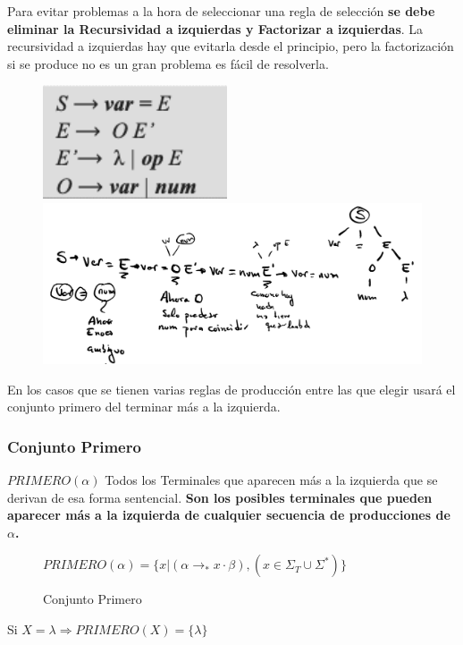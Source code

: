 \documentclass[12pt, twoside, openright]{report} %
\begin{document}
Para evitar problemas a la hora de seleccionar una regla de selección
\textbf{se debe eliminar la Recursividad a izquierdas y Factorizar a
izquierdas}. La recursividad a izquierdas hay que evitarla desde el
principio, pero la factorización si se produce no es un gran problema es
fácil de resolverla.

\begin{figure}[H]
	{\includegraphics[scale=.4]{image-20210312125711682.png}
	\includegraphics[scale=.2]{image-20210312125654582.png}}
\end{figure}

En los casos que se tienen varias reglas de producción entre las que
elegir usará el conjunto primero del terminar más a la izquierda.


\subsubsection{Conjunto Primero}

\(PRIMERO(\alpha)\) Todos los Terminales que aparecen más a la izquierda
que se derivan de esa forma sentencial. \textbf{Son los posibles
terminales que pueden aparecer más a la izquierda de cualquier secuencia
de producciones de \(\alpha\).} 
\begin{figure}[H]
  $PRIMERO(\alpha)=\{ x | (\alpha \rightarrow _* x \cdot \beta), (x \in \Sigma_T \cup \Sigma^*)\}$

  \captionsetup{justification=centering}
  \caption{Conjunto Primero}
\end{figure}
Si \(X=\lambda \Rightarrow PRIMERO(X)=\{\lambda\}\)
\end{document}
